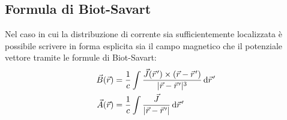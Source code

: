 \documentclass[../main.tex]{subfiles}
\begin{document}
\subsection{Formula di Biot-Savart}
Nel caso in cui la distribuzione di corrente sia sufficientemente localizzata è possibile scrivere in forma esplicita sia il campo magnetico che il potenziale vettore tramite le formule di Biot-Savart:
\begin{align*}
	\vec B(\vec r)&=\frac 1c\int \frac{\vec J(\pvec r')\times(\vec r-\pvec r')}{\abs{\vec r-\pvec r'}^3}\de \pvec r' \label{BiotSavartB} \\
	\vec A(\vec r)&=\frac 1c\int \frac{\vec J}{\abs{\vec r-\pvec r'}}\de \pvec r'
\end{align*}
\end{document}
